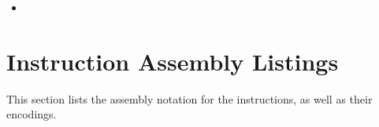 {\begin{minipage}{0.5\textwidth}
\begin{itemize}
{    $ \MEM[*][a_0] \ASN \CPR[*][rs][0]$ \\
    $ \MEM[*][a_1] \ASN \CPR[*][rs][1]$ \\
    $ \MEM[*][a_2] \ASN \CPR[*][rs][2]$ \\
    $ \MEM[*][a_3] \ASN \CPR[*][rs][3]$
}
\item {}
\end{itemize}
\end{minipage}
}
{}


\newpage
\section{Instruction Assembly Listings}

This section lists the assembly notation for the instructions, as well as
their encodings.

